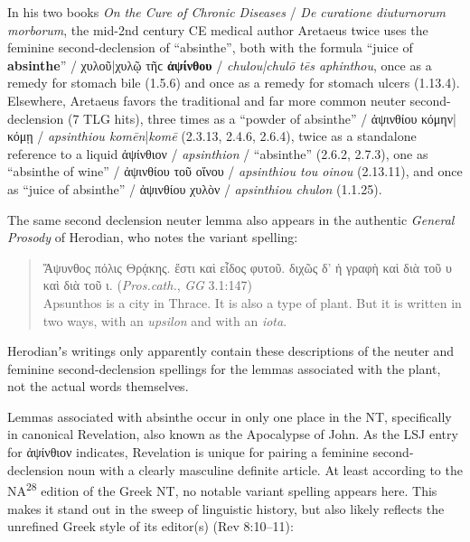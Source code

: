 In his two books \textit{On the Cure of Chronic Diseases} / \textit{De curatione diuturnorum morborum}, %
the mid-2nd century CE medical author Aretaeus twice uses the feminine second-declension of “absinthe”, %
both with the formula “juice of \textbf{absinthe}” / χυλοῦ|χυλῷ τῆϲ \textbf{ἀψίνθου} / \textit{chulou|chulō tēs aphinthou}, %
once as a remedy for stomach bile (1.5.6) %
and once as a remedy for stomach ulcers (1.13.4). %
Elsewhere, Aretaeus favors the traditional and far more common neuter second-declension (7 TLG hits), %
three times as a “powder of absinthe” / ἀψινθίου κόμην|κόμῃ / \textit{apsinthiou komēn}|\textit{komē} (2.3.13, 2.4.6, 2.6.4), %
twice as a standalone reference to a liquid ἀψίνθιον / \textit{apsinthion} / “absinthe” (2.6.2, 2.7.3), 
one as “absinthe of wine” / ἀψινθίου τοῦ οἴνου / \textit{apsinthiou tou oinou} (2.13.11), %
and once as “juice of absinthe” / ἀψινθίου χυλὸν / \textit{apsinthiou chulon} (1.1.25). %

The same second declension neuter lemma also appears in the authentic \textit{General Prosody} of Herodian, %
who notes the variant spelling: %

\vspace*{2mm} 
 \begin{quote}Ἄψυνθος πόλις Θρᾴκης. %
 ἔστι καὶ εἶδος φυτοῦ. %
 διχῶς δ’ ἡ γραφὴ καὶ διὰ τοῦ υ καὶ διὰ τοῦ ι. (\textit{Pros.cath.}, \textit{GG} 3.1:147) \\[1mm] %
  Apsunthos is a city in Thrace. %
  It is also a type of plant. %
  But it is written in two ways, with an \textit{upsilon} and with an \textit{iota}.\end{quote} %
 \vspace*{2mm}

\noindent{}Herodianʼs writings only apparently contain these descriptions %
of the neuter %
and feminine second-declension spellings for the lemmas associated with the plant, %
not the actual words themselves. %

Lemmas associated with absinthe occur in only one place in the NT, %
specifically in canonical Revelation, also known as the Apocalypse of John. %
As the LSJ entry for ἀψίνθιον indicates, %
Revelation is unique for pairing a feminine second-declension noun with a clearly masculine definite article. %
At least according to the NA\textsuperscript{28} edition of the Greek NT, %
no notable variant spelling appears here. %
This makes it stand out in the sweep of linguistic history, %
but also likely reflects the unrefined Greek style of its editor(s) (Rev 8:10--11): %

